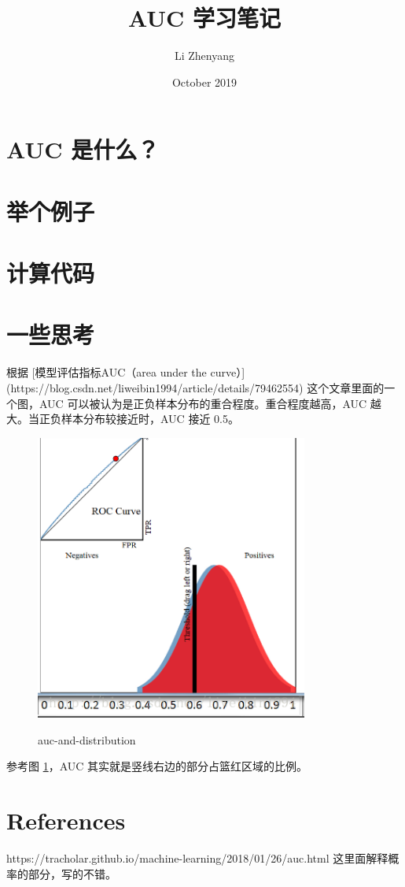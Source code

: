 \documentclass{article}
\title{AUC 学习笔记}
\author{Li Zhenyang}
\date{October 2019}
\begin{document}
   \maketitle
   \section{AUC 是什么？}
   \section{举个例子}
   \section{计算代码}
   \section{一些思考}
   根据 [模型评估指标AUC（area under the curve）](https://blog.csdn.net/liweibin1994/article/details/79462554) 这个文章里面的一个图，AUC 可以被认为是正负样本分布的重合程度。重合程度越高，AUC 越大。当正负样本分布较接近时，AUC 接近 0.5。
   \begin{figure}[h]
       \includegraphics[width=0.8\textwidth]{auc-and-distribution.png}
       \label{auc-and-distribution}
       \caption{auc-and-distribution}
   \end{figure}


   参考图 \ref{auc-and-distribution}，AUC 其实就是竖线右边的部分占篮红区域的比例。

    \section{References} 
     https://tracholar.github.io/machine-learning/2018/01/26/auc.html 这里面解释概率的部分，写的不错。
\end{document}

